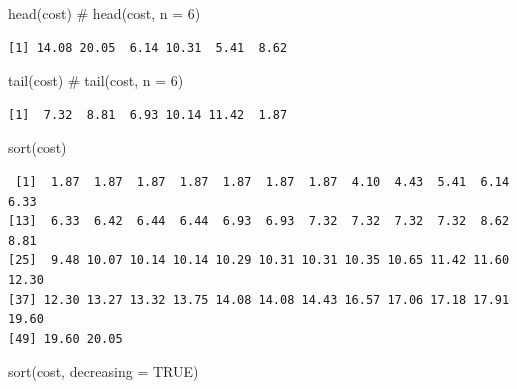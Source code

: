 \documentclass[
  letterpaper,
  DIV=11,
  numbers=noendperiod]{scrreprt}
\newenvironment{Shaded}{\begin{snugshade}}{\end{snugshade}}
\newcommand{\AttributeTok}[1]{\textcolor[rgb]{0.40,0.45,0.13}{#1}}
\newcommand{\CommentTok}[1]{\textcolor[rgb]{0.37,0.37,0.37}{#1}}
\newcommand{\ConstantTok}[1]{\textcolor[rgb]{0.56,0.35,0.01}{#1}}
\newcommand{\FunctionTok}[1]{\textcolor[rgb]{0.28,0.35,0.67}{#1}}
\newcommand{\NormalTok}[1]{\textcolor[rgb]{0.00,0.23,0.31}{#1}}
\begin{document}
\begin{tcolorbox}[enhanced jigsaw, colbacktitle=quarto-callout-tip-color!10!white, opacitybacktitle=0.6, breakable, left=2mm, leftrule=.75mm, toprule=.15mm, toptitle=1mm, bottomtitle=1mm, colframe=quarto-callout-tip-color-frame, opacityback=0, coltitle=black, arc=.35mm, titlerule=0mm, colback=white, bottomrule=.15mm, title=\textcolor{quarto-callout-tip-color}{\faLightbulb}\hspace{0.5em}{Answer}, rightrule=.15mm]

\begin{Shaded}
\begin{Highlighting}[]
\FunctionTok{head}\NormalTok{(cost)    }\CommentTok{\# head(cost, n = 6)}
\end{Highlighting}
\end{Shaded}

\begin{verbatim}
[1] 14.08 20.05  6.14 10.31  5.41  8.62
\end{verbatim}

\begin{Shaded}
\begin{Highlighting}[]
\FunctionTok{tail}\NormalTok{(cost)    }\CommentTok{\# tail(cost, n = 6)}
\end{Highlighting}
\end{Shaded}

\begin{verbatim}
[1]  7.32  8.81  6.93 10.14 11.42  1.87
\end{verbatim}

\begin{Shaded}
\begin{Highlighting}[]
\FunctionTok{sort}\NormalTok{(cost)}
\end{Highlighting}
\end{Shaded}

\begin{verbatim}
 [1]  1.87  1.87  1.87  1.87  1.87  1.87  1.87  4.10  4.43  5.41  6.14  6.33
[13]  6.33  6.42  6.44  6.44  6.93  6.93  7.32  7.32  7.32  7.32  8.62  8.81
[25]  9.48 10.07 10.14 10.14 10.29 10.31 10.31 10.35 10.65 11.42 11.60 12.30
[37] 12.30 13.27 13.32 13.75 14.08 14.08 14.43 16.57 17.06 17.18 17.91 19.60
[49] 19.60 20.05
\end{verbatim}

\begin{Shaded}
\begin{Highlighting}[]
\FunctionTok{sort}\NormalTok{(cost, }\AttributeTok{decreasing =} \ConstantTok{TRUE}\NormalTok{)}
\end{Highlighting}
\end{Shaded}


\end{tcolorbox}
\end{document}

